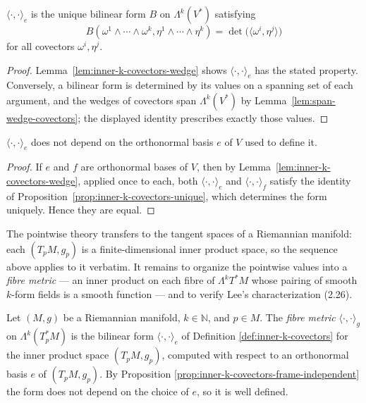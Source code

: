 \begin{proposition}
\label{prop:inner-k-covectors-unique}
\leanok
{}
$\langle \cdot, \cdot \rangle_e$ is the unique bilinear form $B$ on $\Lambda^k(V^*)$ satisfying
\[
B(\omega^1 \wedge \cdots \wedge \omega^k, \eta^1 \wedge \cdots \wedge \eta^k) = \det\big(\langle \omega^i, \eta^j\rangle\big)
\]
for all covectors $\omega^i, \eta^j$.
\end{proposition}
\begin{proof}
\leanok
{}
Lemma~\ref{lem:inner-k-covectors-wedge} shows $\langle \cdot, \cdot \rangle_e$ has the stated property. Conversely, a bilinear form is determined by its values on a spanning set of each argument, and the wedges of covectors span $\Lambda^k(V^*)$ by Lemma~\ref{lem:span-wedge-covectors}; the displayed identity prescribes exactly those values.
\end{proof}

\begin{proposition}
\label{prop:inner-k-covectors-frame-independent}
\leanok
{}
$\langle \cdot, \cdot \rangle_e$ does not depend on the orthonormal basis $e$ of $V$ used to define it.
\end{proposition}
\begin{proof}
\leanok
{}
If $e$ and $f$ are orthonormal bases of $V$, then by Lemma~\ref{lem:inner-k-covectors-wedge}, applied once to each, both $\langle \cdot, \cdot\rangle_e$ and $\langle \cdot, \cdot\rangle_f$ satisfy the identity of Proposition~\ref{prop:inner-k-covectors-unique}, which determines the form uniquely. Hence they are equal.
\end{proof}

The pointwise theory transfers to the tangent spaces of a Riemannian manifold: each $(T_pM, g_p)$ is a finite-dimensional inner product space, so the sequence above applies to it verbatim. It remains to organize the pointwise values into a \emph{fibre metric} --- an inner product on each fibre of $\Lambda^k T^*M$ whose pairing of smooth $k$-form fields is a smooth function --- and to verify Lee's characterization (2.26).

\begin{definition}
\label{def:fiber-metric-forms-pointwise}
\leanok
{}
Let $(M,g)$ be a Riemannian manifold, $k \in \mathbb{N}$, and $p \in M$. The \emph{fibre metric} $\langle \cdot, \cdot \rangle_g$ on $\Lambda^k(T_p^*M)$ is the bilinear form $\langle \cdot, \cdot \rangle_e$ of Definition \ref{def:inner-k-covectors} for the inner product space $(T_pM, g_p)$, computed with respect to an orthonormal basis $e$ of $(T_pM, g_p)$. By Proposition \ref{prop:inner-k-covectors-frame-independent} the form does not depend on the choice of $e$, so it is well defined.
\end{definition}

